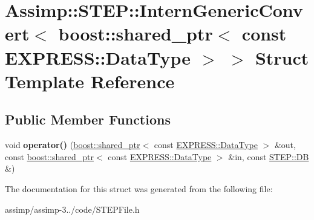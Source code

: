 \hypertarget{struct_assimp_1_1_s_t_e_p_1_1_intern_generic_convert_3_01boost_1_1shared__ptr_3_01const_01_e_x_pa45d610def03ce946d5cb75b5f6cce04}{\section{Assimp\+:\+:S\+T\+E\+P\+:\+:Intern\+Generic\+Convert$<$ boost\+:\+:shared\+\_\+ptr$<$ const E\+X\+P\+R\+E\+S\+S\+:\+:Data\+Type $>$ $>$ Struct Template Reference}
\label{struct_assimp_1_1_s_t_e_p_1_1_intern_generic_convert_3_01boost_1_1shared__ptr_3_01const_01_e_x_pa45d610def03ce946d5cb75b5f6cce04}
}
\subsection*{Public Member Functions}
\begin{DoxyCompactItemize}
\item 
\hypertarget{struct_assimp_1_1_s_t_e_p_1_1_intern_generic_convert_3_01boost_1_1shared__ptr_3_01const_01_e_x_pa45d610def03ce946d5cb75b5f6cce04_a829b46fbacc2dc3bbd50b56b0a24b734}{void {\bfseries operator()} (\hyperlink{classboost_1_1shared__ptr}{boost\+::shared\+\_\+ptr}$<$ const \hyperlink{class_assimp_1_1_s_t_e_p_1_1_e_x_p_r_e_s_s_1_1_data_type}{E\+X\+P\+R\+E\+S\+S\+::\+Data\+Type} $>$ \&out, const \hyperlink{classboost_1_1shared__ptr}{boost\+::shared\+\_\+ptr}$<$ const \hyperlink{class_assimp_1_1_s_t_e_p_1_1_e_x_p_r_e_s_s_1_1_data_type}{E\+X\+P\+R\+E\+S\+S\+::\+Data\+Type} $>$ \&in, const \hyperlink{class_assimp_1_1_s_t_e_p_1_1_d_b}{S\+T\+E\+P\+::\+D\+B} \&)}\label{struct_assimp_1_1_s_t_e_p_1_1_intern_generic_convert_3_01boost_1_1shared__ptr_3_01const_01_e_x_pa45d610def03ce946d5cb75b5f6cce04_a829b46fbacc2dc3bbd50b56b0a24b734}

\end{DoxyCompactItemize}


The documentation for this struct was generated from the following file\+:\begin{DoxyCompactItemize}
\item 
assimp/assimp-\/3../code/S\+T\+E\+P\+File.\+h\end{DoxyCompactItemize}
